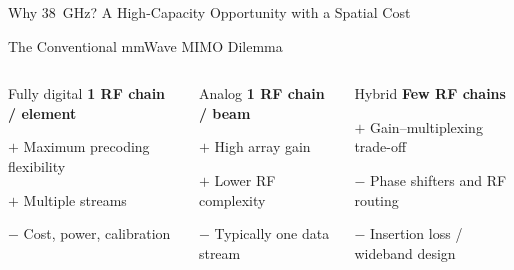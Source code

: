 \begin{frame}[t]{Why 38~GHz? A High-Capacity Opportunity with a Spatial Cost}
\end{frame}


\begin{frame}[t]{The Conventional mmWave MIMO Dilemma}
\small
\begin{columns}[T,onlytextwidth]
  \begin{block}{Fully digital}
    \centering\textbf{1 RF chain / element}\par
    \vspace{0.25cm}
    \raggedright
    \textcolor{green!60!black}{$+$ Maximum precoding flexibility}\par
    \textcolor{green!60!black}{$+$ Multiple streams}\par
    \textcolor{red!75!black}{$-$ Cost, power, calibration}
  \end{block}

  \begin{block}{Analog}
    \centering\textbf{1 RF chain / beam} \cite{Zeng2018}\par
    \vspace{0.25cm}
    \raggedright
    \textcolor{green!60!black}{$+$ High array gain}\par
    \textcolor{green!60!black}{$+$ Lower RF complexity}\par
    \textcolor{red!75!black}{$-$ Typically one data stream}
  \end{block}

  \begin{block}{Hybrid}
    \centering\textbf{Few RF chains} \cite{Payami2020}\par
    \vspace{0.25cm}
    \raggedright
    \textcolor{green!60!black}{$+$ Gain--multiplexing trade-off}\par
    \textcolor{red!75!black}{$-$ Phase shifters and RF routing}\par
    \textcolor{red!75!black}{$-$ Insertion loss / wideband design}
  \end{block}
\end{columns}


\end{frame}
